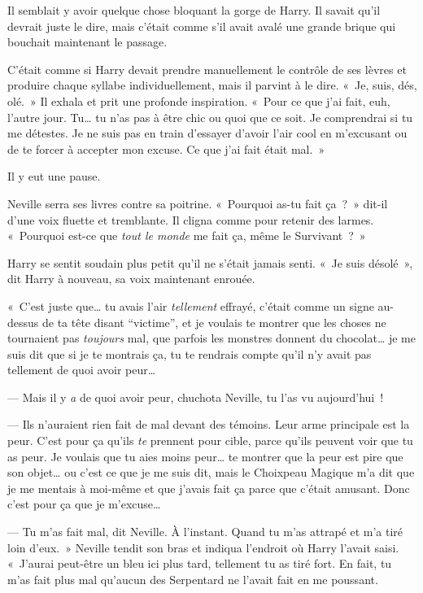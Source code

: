 Il semblait y avoir quelque chose bloquant la gorge de Harry. Il savait qu'il devrait juste le dire, mais c'était comme s'il avait avalé une grande brique qui bouchait maintenant le passage.

C'était comme si Harry devait prendre manuellement le contrôle de ses lèvres et produire chaque syllabe individuellement, mais il parvint à le dire. «~Je, suis, dés, olé.~» Il exhala et prit une profonde inspiration. «~Pour ce que j'ai fait, euh, l'autre jour. Tu… tu n'as pas à être chic ou quoi que ce soit. Je comprendrai si tu me détestes. Je ne suis pas en train d'essayer d'avoir l'air cool en m'excusant ou de te forcer à accepter mon excuse. Ce que j'ai fait était mal.~»

Il y eut une pause.

Neville serra ses livres contre sa poitrine. «~Pourquoi as-tu fait ça~?~» dit-il d'une voix fluette et tremblante. Il cligna comme pour retenir des larmes. «~Pourquoi est-ce que \emph{tout le monde} me fait ça, même le Survivant~?~»

Harry se sentit soudain plus petit qu'il ne s'était jamais senti. «~Je suis désolé~», dit Harry à nouveau, sa voix maintenant enrouée.

«~C'est juste que… tu avais l'air \emph{tellement} effrayé, c'était comme un signe au-dessus de ta tête disant “victime”, et je voulais te montrer que les choses ne tournaient pas \emph{toujours} mal, que parfois les monstres donnent du chocolat… je me suis dit que si je te montrais ça, tu te rendrais compte qu'il n'y avait pas tellement de quoi avoir peur…

--- Mais il y \emph{a} de quoi avoir peur, chuchota Neville, tu l'as vu aujourd'hui~!

--- Ils n'auraient rien fait de mal devant des témoins. Leur arme principale est la peur. C'est pour ça qu'ils \emph{te} prennent pour cible, parce qu'ils peuvent voir que tu as peur. Je voulais que tu aies moins peur… te montrer que la peur est pire que son objet… ou c'est ce que je me suis dit, mais le Choixpeau Magique m'a dit que je me mentais à moi-même et que j'avais fait ça parce que c'était amusant. Donc c'est pour ça que je m'excuse…

--- Tu m'as fait mal, dit Neville. À l'instant. Quand tu m'as attrapé et m'a tiré loin d'eux.~» Neville tendit son bras et indiqua l'endroit où Harry l'avait saisi. «~J'aurai peut-être un bleu ici plus tard, tellement tu as tiré fort. En fait, tu m'as fait plus mal qu'aucun des Serpentard ne l'avait fait en me poussant.

